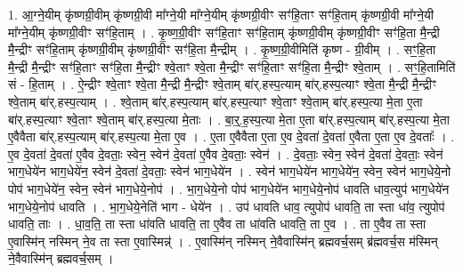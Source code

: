 \documentclass[17pt]{extarticle}
\begin{document}
1. आ॒ग्ने॒यीम् कृ॑ष्णग्री॒वीम् कृ॑ष्णग्री॒वी मा᳚ग्ने॒यी मा᳚ग्ने॒यीम् कृ॑ष्णग्री॒वीꣳ सꣳ॑हि॒ताꣳ सꣳ॑हि॒ताम् कृ॑ष्णग्री॒वी मा᳚ग्ने॒यी मा᳚ग्ने॒यीम् कृ॑ष्णग्री॒वीꣳ सꣳ॑हि॒ताम् । . कृ॒ष्ण॒ग्री॒वीꣳ सꣳ॑हि॒ताꣳ सꣳ॑हि॒ताम् कृ॑ष्णग्री॒वीम् कृ॑ष्णग्री॒वीꣳ सꣳ॑हि॒ता मै॒न्द्री मै॒न्द्रीꣳ सꣳ॑हि॒ताम् कृ॑ष्णग्री॒वीम् कृ॑ष्णग्री॒वीꣳ सꣳ॑हि॒ता मै॒न्द्रीम् । . कृ॒ष्ण॒ग्री॒वीमिति॑ कृष्ण - ग्री॒वीम् । . सꣳ॒॒हि॒ता मै॒न्द्री मै॒न्द्रीꣳ सꣳ॑हि॒ताꣳ सꣳ॑हि॒ता मै॒न्द्रीꣳ श्वे॒ताꣳ श्वे॒ता मै॒न्द्रीꣳ सꣳ॑हि॒ताꣳ सꣳ॑हि॒ता मै॒न्द्रीꣳ श्वे॒ताम् । . सꣳ॒॒हि॒तामिति॑ सं - हि॒ताम् । . ऐ॒न्द्रीꣳ श्वे॒ताꣳ श्वे॒ता मै॒न्द्री मै॒न्द्रीꣳ श्वे॒ताम् बा॑र्.हस्प॒त्याम् बा॑र्.हस्प॒त्याꣳ श्वे॒ता मै॒न्द्री मै॒न्द्रीꣳ श्वे॒ताम् बा॑र्.हस्प॒त्याम् । . श्वे॒ताम् बा॑र्.हस्प॒त्याम् बा॑र्.हस्प॒त्याꣳ श्वे॒ताꣳ श्वे॒ताम् बा॑र्.हस्प॒त्या मे॒ता ए॒ता बा॑र्.हस्प॒त्याꣳ श्वे॒ताꣳ श्वे॒ताम् बा॑र्.हस्प॒त्या मे॒ताः । . बा॒र्॒.ह॒स्प॒त्या मे॒ता ए॒ता बा॑र्.हस्प॒त्याम् बा॑र्.हस्प॒त्या मे॒ता ए॒वैवैता बा॑र्.हस्प॒त्याम् बा॑र्.हस्प॒त्या मे॒ता ए॒व । . ए॒ता ए॒वैवैता ए॒ता ए॒व दे॒वता॑ दे॒वता॑ ए॒वैता ए॒ता ए॒व दे॒वताः᳚ । . ए॒व दे॒वता॑ दे॒वता॑ ए॒वैव दे॒वताः॒ स्वेन॒ स्वेन॑ दे॒वता॑ ए॒वैव दे॒वताः॒ स्वेन॑ । . दे॒वताः॒ स्वेन॒ स्वेन॑ दे॒वता॑ दे॒वताः॒ स्वेन॑ भाग॒धेये॑न भाग॒धेये॑न॒ स्वेन॑ दे॒वता॑ दे॒वताः॒ स्वेन॑ भाग॒धेये॑न । . स्वेन॑ भाग॒धेये॑न भाग॒धेये॑न॒ स्वेन॒ स्वेन॑ भाग॒धेये॒नो पोप॑ भाग॒धेये॑न॒ स्वेन॒ स्वेन॑ भाग॒धेये॒नोप॑ । . भा॒ग॒धेये॒नो पोप॑ भाग॒धेये॑न भाग॒धेये॒नोप॑ धावति धाव॒त्युप॑ भाग॒धेये॑न भाग॒धेये॒नोप॑ धावति । . भा॒ग॒धेये॒नेति॑ भाग - धेये॑न । . उप॑ धावति धाव॒ त्युपोप॑ धावति॒ ता स्ता धा॑व॒ त्युपोप॑ धावति॒ ताः । . धा॒व॒ति॒ ता स्ता धा॑वति धावति॒ ता ए॒वैव ता धा॑वति धावति॒ ता ए॒व । . ता ए॒वैव ता स्ता ए॒वास्मि॑न् नस्मिन् ने॒व ता स्ता ए॒वास्मिन्न्॑ । . ए॒वास्मि॑न् नस्मिन् ने॒वैवास्मि॑न् ब्रह्मवर्च॒सम् ब्र॑ह्मवर्च॒स म॑स्मिन् ने॒वैवास्मि॑न् ब्रह्मवर्च॒सम् । \newline
\end{document}
